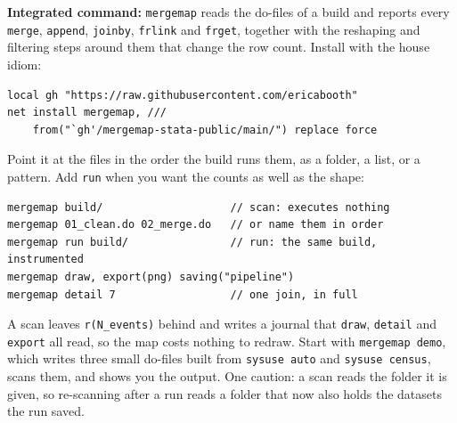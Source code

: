 \documentclass[
    a4paper,
    fontsize=10pt,
    twoside=true,
    numbers=noenddot,
]{kaobook}
\begin{document}
\begin{kaobox}[frametitle=Package Integration: \texttt{mergemap}]
\textbf{Integrated command:} \texttt{mergemap} reads the do-files of a build and reports every \texttt{merge}, \texttt{append}, \texttt{joinby}, \texttt{frlink} and \texttt{frget}, together with the reshaping and filtering steps around them that change the row count. Install with the house idiom:
\par
{\footnotesize
\begin{verbatim}
local gh "https://raw.githubusercontent.com/ericabooth"
net install mergemap, ///
    from("`gh'/mergemap-stata-public/main/") replace force
\end{verbatim}
}
Point it at the files in the order the build runs them, as a folder, a list, or a pattern. Add \texttt{run} when you want the counts as well as the shape:
\par
{\footnotesize
\begin{verbatim}
mergemap build/                    // scan: executes nothing
mergemap 01_clean.do 02_merge.do   // or name them in order
mergemap run build/                // run: the same build, instrumented
mergemap draw, export(png) saving("pipeline")
mergemap detail 7                  // one join, in full
\end{verbatim}
}
A scan leaves \texttt{r(N\_events)} behind and writes a journal that \texttt{draw}, \texttt{detail} and \texttt{export} all read, so the map costs nothing to redraw. Start with \texttt{mergemap demo}, which writes three small do-files built from \texttt{sysuse auto} and \texttt{sysuse census}, scans them, and shows you the output. One caution: a scan reads the folder it is given, so re-scanning after a run reads a folder that now also holds the datasets the run saved.
\end{kaobox}
\end{document}
